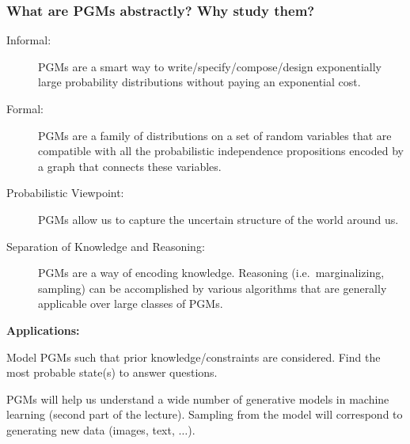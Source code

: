 \begin{frame}
    \frametitle{What are PGMs abstractly? Why study them?}
\begin{description}
\item[Informal:] PGMs are a smart way to write/specify/compose/design exponentially large probability distributions without paying an exponential cost.
\pause \item[Formal:] PGMs are a family of distributions on a set of random variables that are compatible with all the probabilistic independence propositions encoded by a graph that connects these variables.
\pause \item[Probabilistic Viewpoint:] PGMs allow us to capture the uncertain structure of the world around us.
\pause \item[Separation of Knowledge and Reasoning:] PGMs are a way of encoding knowledge. Reasoning (i.e.\ marginalizing, sampling) can be accomplished by various algorithms that are generally applicable over large classes of PGMs.
\end{description}

\pause
\textbf{Applications:}

\begin{description}
\pause \item[Expert Systems (circa 1970s):] Model PGMs such that prior knowledge/constraints are considered. Find the most probable state(s) to answer questions.
\item[Generative Models (today):] PGMs will help us understand a wide number of generative models in machine learning (second part of the lecture). Sampling from the model will correspond to generating new data (images, text, $\ldots$).
\end{description}
\end{frame}

